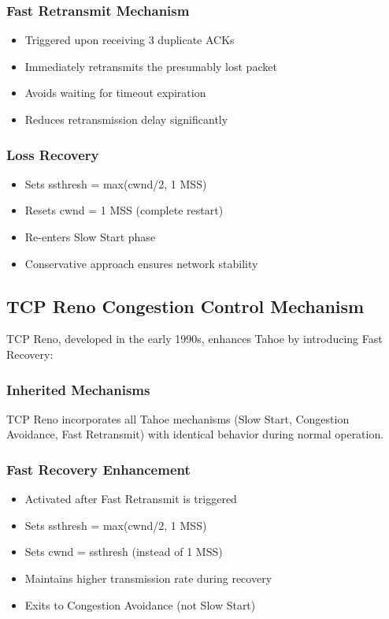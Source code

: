 \documentclass[12pt]{article}
\begin{document}
\subsubsection{Fast Retransmit Mechanism}
\begin{itemize}
    \item Triggered upon receiving 3 duplicate ACKs
    \item Immediately retransmits the presumably lost packet
    \item Avoids waiting for timeout expiration
    \item Reduces retransmission delay significantly
\end{itemize}

\subsubsection{Loss Recovery}
\begin{itemize}
    \item Sets ssthresh = max(cwnd/2, 1 MSS)
    \item Resets cwnd = 1 MSS (complete restart)
    \item Re-enters Slow Start phase
    \item Conservative approach ensures network stability
\end{itemize}

\subsection{TCP Reno Congestion Control Mechanism}

TCP Reno, developed in the early 1990s, enhances Tahoe by introducing Fast Recovery:

\subsubsection{Inherited Mechanisms}
TCP Reno incorporates all Tahoe mechanisms (Slow Start, Congestion Avoidance, Fast Retransmit) with identical behavior during normal operation.

\subsubsection{Fast Recovery Enhancement}
\begin{itemize}
    \item Activated after Fast Retransmit is triggered
    \item Sets ssthresh = max(cwnd/2, 1 MSS)
    \item Sets cwnd = ssthresh (instead of 1 MSS)
    \item Maintains higher transmission rate during recovery
    \item Exits to Congestion Avoidance (not Slow Start)
\end{itemize}
\end{document}
